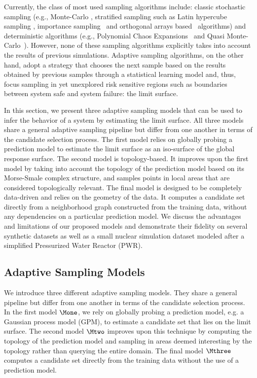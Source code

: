 Currently, the class of most used sampling algorithms include: classic stochastic sampling (e.g., Monte-Carlo \cite{Hastings1970,Liu2001}, stratified sampling such as Latin hypercube sampling \cite{HeltonDavis2003}, importance sampling~\cite{Geweke1989} and orthogonal arrays based~\cite{Owen1992} algorithms) and deterministic algorithms (e.g., Polynomial Chaos Expansions~\cite{Najm2009} and Quasi Monte-Carlo~\cite{Caflisch1998}).
%
However, none of these sampling algorithms explicitly takes into account the results of previous simulations.
%
Adaptive sampling algorithms, on the other hand, adopt a strategy that chooses the next sample based on the results obtained by previous samples through a statistical learning model and, thus, focus sampling in yet unexplored risk sensitive regions such as boundaries between system safe and system failure: the limit surface.

In this section, we present three adaptive sampling models that can be used to infer the behavior of a system by estimating the limit surface.
%
All three models share a general adaptive sampling pipeline but differ from one another in terms of the candidate selection process.
%
The first model relies on globally probing a prediction model to estimate the limit surface as an iso-surface of the global response surface.
%
The second model is topology-based.
%
It improves upon the first model by taking into account the topology of the prediction model based on its Morse-Smale complex structure, and samples points in local areas that are considered topologically relevant.
%
The final model is designed to be completely data-driven and relies on the geometry of the data. It computes a candidate set directly from a neighborhood graph constructed from the training data, without any dependencies on a particular prediction model.
%
We discuss the advantages and limitations of our proposed models and demonstrate their fidelity on several synthetic datasets as well as a small nuclear simulation dataset modeled after a simplified Pressurized Water Reactor (PWR).

\subsection{Adaptive Sampling Models}
\label{sec:pipelines}

We introduce three different adaptive sampling models.
%
They share a general pipeline but differ from one another in terms of the candidate selection process.
%
In the first model $\Mone$, we rely on globally probing a prediction model, e.g. a Gaussian process model (GPM), to estimate a candidate set that lies on the limit surface.
%
The second model $\Mtwo$ improves upon this technique by computing the topology of the prediction model and sampling in areas deemed interesting by the topology rather than querying the entire domain.
%
The final model $\Mthree$ computes a candidate set directly from the training data without the use of a prediction model.

